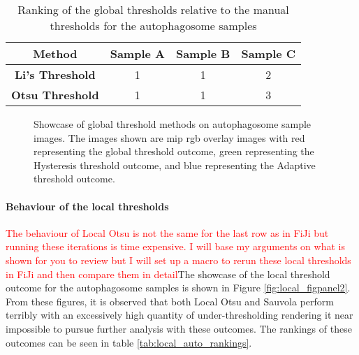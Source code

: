\begin{table}[h!]
    \centering
    \begin{tabular}{|c|c|c|c|} \hline 
         \textbf{Method}&  \textbf{Sample A}&  \textbf{Sample B}& \textbf{Sample C}\\ \hline 
         \textbf{Li's Threshold}&  1&  1& 2\\ \hline 
         \textbf{Otsu Threshold}&  1&  1& 3\\ \hline
    \end{tabular}
    \caption{Ranking of the global thresholds relative to the manual thresholds for the autophagosome samples}
    \label{tab:global_auto_rankings}
\end{table}
\begin{figure}[h!]
    \centering
    \caption[Showcase of global threshold methods on autophagosome sample images]{Showcase of global threshold methods on autophagosome sample images. The images shown are \gls{mip} \gls{rgb} overlay images with red representing the global threshold outcome, green representing the Hysteresis threshold outcome, and blue representing the Adaptive threshold outcome.}
    \label{fig:auto_global_outcomes}
\end{figure}

\paragraph{Behaviour of the local thresholds}
\textcolor{red}{The behaviour of Local Otsu is not the same for the last row as in FiJi but running these iterations is time expensive. I will base my arguments on what is shown for you to review but I will set up a macro to rerun these local thresholds in FiJi and then compare them in detail}\newline The showcase of the local threshold outcome for the autophagosome samples is shown in Figure \ref{fig:local_figpanel2}. From these figures, it is observed that both Local Otsu and Sauvola perform terribly with an excessively high quantity of under-thresholding rendering it near impossible to pursue further analysis with these outcomes. The rankings of these outcomes can be seen in table \ref{tab:local_auto_rankings}.


